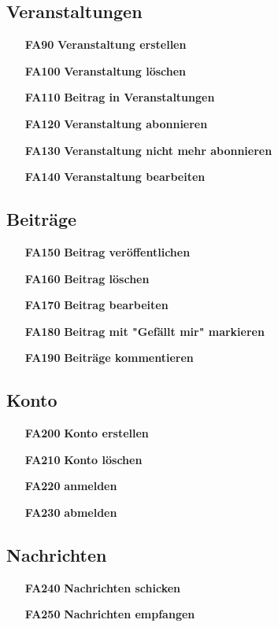 \documentclass[parskip=full]{scrartcl}
\begin{document}
		\subsection{Veranstaltungen}
		\begin{itemize}[nosep]
			\item[\textbf{FA90}]\textbf{Veranstaltung erstellen}
			\item[\textbf{FA100}]\textbf{Veranstaltung löschen}
			\item[\textbf{FA110}]\textbf{Beitrag in Veranstaltungen}
			\item[\textbf{FA120}]\textbf{Veranstaltung abonnieren}
			\item[\textbf{FA130}]\textbf{Veranstaltung nicht mehr abonnieren}
			\item[\textbf{FA140}]\textbf{Veranstaltung bearbeiten}
		\end{itemize}
		
		\subsection{Beiträge}
		\begin{itemize}[nosep]
			\item[\textbf{FA150}]\textbf{Beitrag veröffentlichen}
			\item[\textbf{FA160}]\textbf{Beitrag löschen}
			\item[\textbf{FA170}]\textbf{Beitrag bearbeiten}
			\item[\textbf{FA180}]\textbf{Beitrag mit "Gefällt mir" markieren}
			\item[\textbf{FA190}]\textbf{Beiträge kommentieren}
		\end{itemize}
		
		\subsection{Konto}
		\begin{itemize}[nosep]
			\item[\textbf{FA200}]\textbf{Konto erstellen}
			\item[\textbf{FA210}]\textbf{Konto löschen}
			\item[\textbf{FA220}]\textbf{anmelden}
			\item[\textbf{FA230}]\textbf{abmelden}
		\end{itemize}
		
		\subsection{Nachrichten}
		\begin{itemize}[nosep]
			\item[\textbf{FA240}]\textbf{Nachrichten schicken}
			\item[\textbf{FA250}]\textbf{ Nachrichten empfangen}
		\end{itemize}
		
\end{document}
